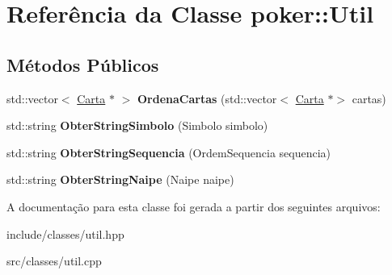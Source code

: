 \hypertarget{classpoker_1_1Util}{}\section{Referência da Classe poker\+:\+:Util}
\label{classpoker_1_1Util}
\subsection*{Métodos Públicos}
\begin{DoxyCompactItemize}
\item 
\mbox{\label{classpoker_1_1Util_aea246f2f5ce97766b24820fc736b9adf}} 
std\+::vector$<$ \hyperlink{classpoker_1_1Carta}{Carta} $\ast$ $>$ {\bfseries Ordena\+Cartas} (std\+::vector$<$ \hyperlink{classpoker_1_1Carta}{Carta} $\ast$$>$ cartas)
\item 
\mbox{\label{classpoker_1_1Util_a5de178d06b82a3de7f5326071e32d3c9}} 
std\+::string {\bfseries Obter\+String\+Simbolo} (Simbolo simbolo)
\item 
\mbox{\label{classpoker_1_1Util_a0b35bf63ebea151857d8d7bfadaf9247}} 
std\+::string {\bfseries Obter\+String\+Sequencia} (Ordem\+Sequencia sequencia)
\item 
\mbox{\label{classpoker_1_1Util_ae29119797d21b31bc1f6bfe7d0de5925}} 
std\+::string {\bfseries Obter\+String\+Naipe} (Naipe naipe)
\end{DoxyCompactItemize}


A documentação para esta classe foi gerada a partir dos seguintes arquivos\+:\begin{DoxyCompactItemize}
\item 
include/classes/util.\+hpp\item 
src/classes/util.\+cpp\end{DoxyCompactItemize}
